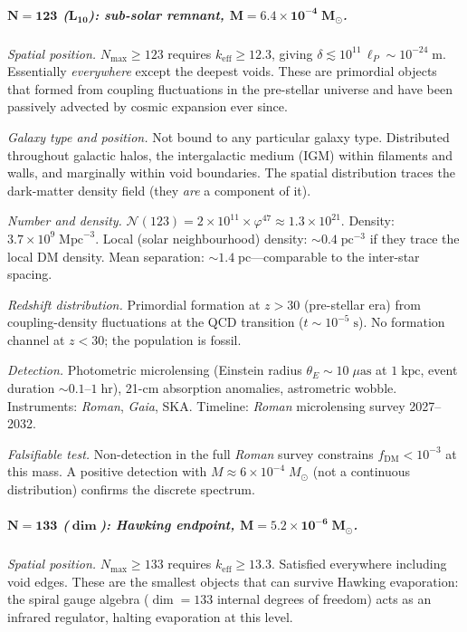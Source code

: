 \documentclass[12pt,a4paper]{article}
\begin{document}
\subparagraph{$\boldsymbol{N = 123}$ ($\boldsymbol{L_{10}}$): sub-solar remnant, $\boldsymbol{M = 6.4 \times 10^{-4}\;M_\odot}$.}

\textit{Spatial position.}\; $N_{\max} \geq 123$ requires $k_{\mathrm{eff}} \geq 12.3$, giving $\delta \lesssim 10^{11}\,\ell_P \sim 10^{-24}\;\mathrm{m}$.  Essentially \emph{everywhere} except the deepest voids.  These are primordial objects that formed from coupling fluctuations in the pre-stellar universe and have been passively advected by cosmic expansion ever since.

\textit{Galaxy type and position.}\; Not bound to any particular galaxy type.  Distributed throughout galactic halos, the intergalactic medium (IGM) within filaments and walls, and marginally within void boundaries.  The spatial distribution traces the dark-matter density field (they \emph{are} a component of it).

\textit{Number and density.}\; $\mathcal{N}(123) = 2 \times 10^{11} \times \varphi^{47} \approx 1.3 \times 10^{21}$.  Density: $3.7 \times 10^{9}\;\mathrm{Mpc}^{-3}$.  Local (solar neighbourhood) density: $\sim 0.4\;\mathrm{pc}^{-3}$ if they trace the local DM density.  Mean separation: $\sim 1.4\;\mathrm{pc}$---comparable to the inter-star spacing.

\textit{Redshift distribution.}\; Primordial formation at $z > 30$ (pre-stellar era) from coupling-density fluctuations at the QCD transition ($t \sim 10^{-5}\;\mathrm{s}$).  No formation channel at $z < 30$; the population is fossil.

\textit{Detection.}\; Photometric microlensing (Einstein radius $\theta_E \sim 10\;\mu\mathrm{as}$ at $1\;\mathrm{kpc}$, event duration $\sim 0.1$--$1\;\mathrm{hr}$), 21-cm absorption anomalies, astrometric wobble.  Instruments: \emph{Roman}, \emph{Gaia}, SKA.  Timeline: \emph{Roman} microlensing survey 2027--2032.

\textit{Falsifiable test.}\; Non-detection in the full \emph{Roman} survey constrains $f_{\mathrm{DM}} < 10^{-3}$ at this mass.  A positive detection with $M \approx 6 \times 10^{-4}\;M_\odot$ (not a continuous distribution) confirms the discrete spectrum.

\subparagraph{$\boldsymbol{N = 133}$ ($\boldsymbol{\dim}$): Hawking endpoint, $\boldsymbol{M = 5.2 \times 10^{-6}\;M_\odot}$.}

\textit{Spatial position.}\; $N_{\max} \geq 133$ requires $k_{\mathrm{eff}} \geq 13.3$.  Satisfied everywhere including void edges.  These are the smallest objects that can survive Hawking evaporation: the spiral gauge algebra ($\dim = 133$ internal degrees of freedom) acts as an infrared regulator, halting evaporation at this level.
\end{document}
